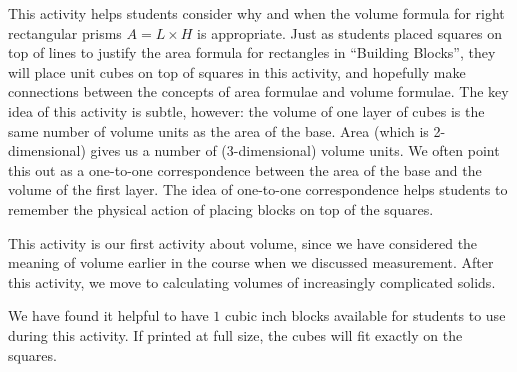 \documentclass[nooutcomes]{ximera}
\begin{document}
\begin{instructorNotes}
This activity helps students consider why and when the volume formula for right rectangular prisms $A = L \times H$ is appropriate.  Just as students placed squares on top of lines to justify the area formula for rectangles in ``Building Blocks'', they will place unit cubes on top of squares in this activity, and hopefully make connections between the concepts of area formulae and volume formulae.  The key idea of this activity is subtle, however:  the volume of one layer of cubes is the same number of volume units as the area of the base.  Area (which is 2-dimensional) gives us a number of (3-dimensional) volume units.  We often point this out as a one-to-one correspondence between the area of the base and the volume of the first layer.  The idea of one-to-one correspondence helps students to remember the physical action of placing blocks on top of the squares.  


This activity is our first activity about volume, since we have considered the meaning of volume earlier in the course when we discussed measurement.  After this activity, we move to calculating volumes of increasingly complicated solids.

We have found it helpful to have $1$ cubic inch blocks available for students to use during this activity.  If printed at full size, the cubes will fit exactly on the squares.




\end{instructorNotes}
\end{document}
